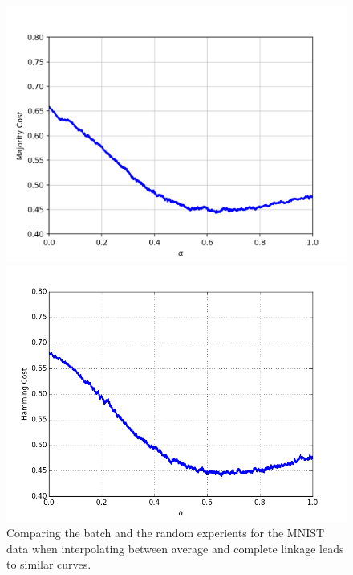 \begin{figure}[h]
\centering
\begin{minipage}{.45\textwidth}
  \centering
  \includegraphics[width=\linewidth]{plots/mnist-ac-averaged}
\end{minipage}
\begin{minipage}{.45\textwidth}
  \centering
  \includegraphics[width=\linewidth]{plots/mnist-ac-random}
\end{minipage}
\caption{Comparing the batch and the random experients for the MNIST data when interpolating between average and complete linkage leads to similar curves.}
\label{fig:mnistacavg}
\end{figure}

